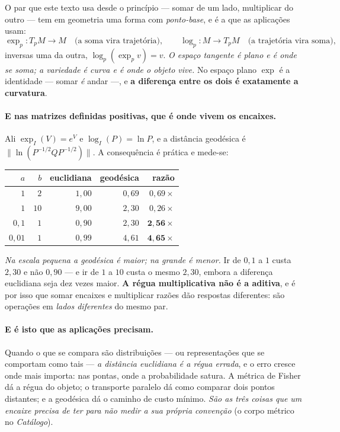 \documentclass[livro.tex]{subfiles}
\begin{document}
O par que este texto usa desde o princípio --- somar de um lado, multiplicar do outro --- tem em
geometria uma forma com \emph{ponto-base}, e é a que as aplicações usam:
\[
  \exp_{p}: T_{p}M \to M \quad\text{(a soma vira trajetória)},
  \qquad
  \log_{p}: M \to T_{p}M \quad\text{(a trajetória vira soma)},
\]
inversas uma da outra, $\log_{p}(\exp_{p}v)=v$. \emph{O espaço tangente é plano e é onde se soma; a
variedade é curva e é onde o objeto vive.} No espaço plano $\exp$ é a identidade --- somar \emph{é}
andar ---, e \textbf{a diferença entre os dois é exatamente a curvatura}.

\paragraph{E nas matrizes definidas positivas, que é onde vivem os encaixes.} Ali
$\exp_{I}(V)=e^{V}$ e $\log_{I}(P)=\ln P$, e a distância geodésica é
$\lVert\ln(P^{-1/2}QP^{-1/2})\rVert$. A consequência é prática e mede-se:

\begin{center}\small
\begin{tabular}{@{}rrrrr@{}}
\toprule
$a$ & $b$ & euclidiana & geodésica & razão \\
\midrule
$1$    & $2$  & $1{,}00$ & $0{,}69$ & $0{,}69\times$ \\
$1$    & $10$ & $9{,}00$ & $2{,}30$ & $0{,}26\times$ \\
$0{,}1$ & $1$  & $0{,}90$ & $2{,}30$ & $\mathbf{2{,}56\times}$ \\
$0{,}01$& $1$  & $0{,}99$ & $4{,}61$ & $\mathbf{4{,}65\times}$ \\
\bottomrule
\end{tabular}
\end{center}

\noindent \emph{Na escala pequena a geodésica é maior; na grande é menor.} Ir de $0{,}1$ a $1$ custa
$2{,}30$ e não $0{,}90$ --- e ir de $1$ a $10$ custa o mesmo $2{,}30$, embora a diferença euclidiana
seja dez vezes maior. \textbf{A régua multiplicativa não é a aditiva}, e é por isso que somar
encaixes e multiplicar razões dão respostas diferentes: são operações em \emph{lados diferentes} do
mesmo par.

\paragraph{E é isto que as aplicações precisam.} Quando o que se compara são distribuições --- ou
representações que se comportam como tais --- \emph{a distância euclidiana é a régua errada}, e o
erro cresce onde mais importa: nas pontas, onde a probabilidade satura. A métrica de Fisher dá a
régua do objeto; o transporte paralelo dá como comparar dois pontos distantes; e a geodésica dá o
caminho de custo mínimo. \emph{São as três coisas que um encaixe precisa de ter para não medir a sua
própria convenção} (o corpo métrico no \emph{Catálogo}).
\end{document}

